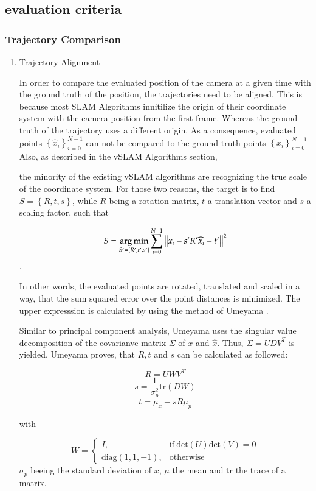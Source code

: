 \subsection{evaluation criteria}
\subsubsection{Trajectory Comparison}

	\begin{enumerate}
	\item{Trajectory Alignment}
	
	In order to compare the evaluated position of the camera at a given time with the ground truth of the 
	position, the trajectories need to be aligned. This is because most SLAM Algorithms innitilize the origin
	of their coordinate system with the camera position from the first frame. Whereas the ground truth of the 
	trajectory uses a different origin. As a consequence, evaluated points $ \left\{{\widehat{x}_i}\right\}_{i=0}^{N-1}$ can not be 
	compared to the ground truth points $\left\{{x_i}\right\}_{i=0}^{N-1}$
	Also, as described in the vSLAM Algorithms section,
	
	
	the minority of the existing vSLAM algorithms are recognizing the true scale of the coordinate system. For
	those two reasons, the target is to find $S = \left\{R,t,s\right\}$, while $R$ being a rotation matrix, $t$ a translation vector
	and $s$ a scaling factor, 
	such that
	
	$$ S = \mathop{\mathrm{arg\,min}}_{S' = \left\{R', t', s' \right\}} \sum_{i = 0}^{N-1} \left\lVert x_i - s'R'\widehat{x}_i - t'\right\rVert^2 $$ .
	
	In other words, the evaluated points are rotated, translated and scaled in a way, that the sum squared error over the point
	distances is minimized. The upper expresssion is calculated by using the method of Umeyama \cite{ume}. 
	
	Similar to principal component analysis, Umeyama uses the singular value decomposition of the covarianve 
	matrix $\Sigma$ of $x$ and $\widehat{x}$. Thus, 
	$\Sigma = UDV^T$ is yielded. Umeyama proves, that $R,t$ and $s$ can be calculated as followed: 
	
	$$ R = UWV^T $$
	$$ s = \frac{1}{\sigma^2_p}\text{tr}\left(DW\right)$$
	$$ t = \mu_{\widehat{x}} - sR\mu_p $$
	
	with 
	
	$$ W = \begin{cases}
      I, & \text{if}\ \text{det}\left(U\right)\text{det}\left(V\right) =0 \\
      \text{diag}\left(1,1,-1\right), & \text{otherwise}
    \end{cases}$$
	$\sigma_p$ beeing the standard deviation of $x$, $\mu$ the mean and $\text{tr}$ the trace of a matrix. 
	

\end{enumerate}
